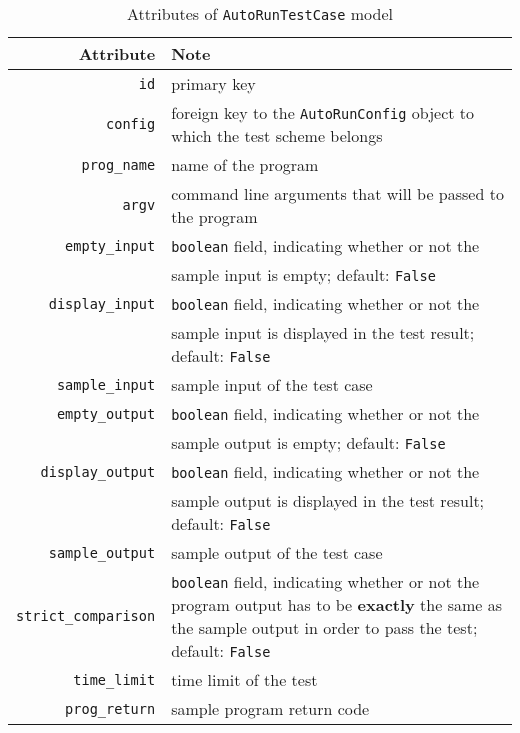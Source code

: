 \begin{table}[h]
    \centering
    \caption{Attributes of \texttt{AutoRunTestCase} model}
    \label{tab:TC_ATTR}
    \renewcommand{\arraystretch}{1.3}
    \begin{tabular}[h]{r|p{4in}}
        \hline
        Attribute & Note \\
        \hline
        \hline

        \texttt{id} & primary key \\
        \hline
        \texttt{config} & foreign key to the \texttt{AutoRunConfig} object to
            which the  test scheme belongs \\
        \hline
        \hline

        \texttt{prog\_name} & name of the program \\
        \hline
        \texttt{argv} & command line arguments that will be passed to the  program \\
        \hline
        \hline

        \texttt{empty\_input} & \texttt{boolean} field, indicating whether or not the \\
            & sample input is empty;  default: \texttt{False} \\
        \hline
        \texttt{display\_input} & \texttt{boolean} field, indicating whether or not the \\
            & sample input is displayed in the test result;  default: \texttt{False} \\
        \hline
        \texttt{sample\_input} & sample input of the test case \\
        \hline
        \hline

        \texttt{empty\_output} & \texttt{boolean} field, indicating whether or not the \\
            & sample output is empty; default: \texttt{False} \\
        \hline
        \texttt{display\_output} & \texttt{boolean} field, indicating whether or not the \\
            & sample output is displayed in the test result;  default: \texttt{False} \\
        \hline
        \texttt{sample\_output} & sample output of the test case \\
        \hline
        \texttt{strict\_comparison} & \texttt{boolean} field, indicating
            whether or not the program
            output has to be \textbf{exactly} the same as the sample output
            in order to pass the test; default: \texttt{False} \\
        \hline
        \hline
        \texttt{time\_limit} & time limit of the test \\
        \hline
        \texttt{prog\_return} & sample program return code \\
        \hline
    \end{tabular}
\end{table}

